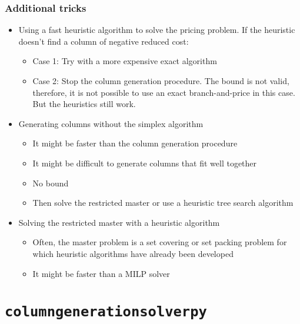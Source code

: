 \documentclass[10pt]{beamer}
\begin{document}
\begin{frame}
  \frametitle{Additional tricks}

  \begin{itemize}
    \item Using a fast heuristic algorithm to solve the pricing problem. If the heuristic doesn't find a column of negative reduced cost:
      \begin{itemize}
        \item Case 1: Try with a more expensive exact algorithm
        \item Case 2: Stop the column generation procedure. The bound is not valid, therefore, it is not possible to use an exact branch-and-price in this case. But the heuristics still work.
      \end{itemize}
    \item Generating columns without the simplex algorithm
      \begin{itemize}
        \item It might be faster than the column generation procedure
        \item It might be difficult to generate columns that fit well together
        \item No bound
        \item Then solve the restricted master or use a heuristic tree search algorithm
      \end{itemize}
    \item Solving the restricted master with a heuristic algorithm
      \begin{itemize}
        \item Often, the master problem is a set covering or set packing problem for which heuristic algorithms have already been developed
        \item It might be faster than a MILP solver
      \end{itemize}
  \end{itemize}
\end{frame}

\section{\texttt{columngenerationsolverpy}}
\end{document}
